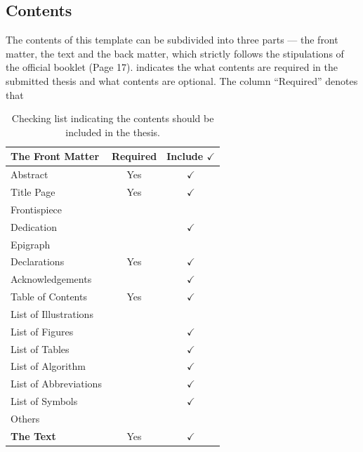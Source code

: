 \subsection{Contents}
The contents of this template can be subdivided into three parts --- the front matter, the text and the back matter, which strictly follows the stipulations of the official booklet (Page 17).  indicates the what contents are required in the submitted thesis and what contents are optional. The column ``Required'' denotes that 
\begin{center}
\begin{longtable}{|l|c|c|}
\caption{Checking list indicating the contents should be included in the thesis.}\label{chap1:longtable:checking_list}\\
\hline
\textbf{The Front Matter} & Required     &  Include $\checkmark$ \\ \hline \hline
Abstract                  & Yes          & $\checkmark$         \\
Title Page                & Yes          & $\checkmark$         \\
Frontispiece              &              &                      \\
Dedication                &              & $\checkmark$         \\
Epigraph                  &              &                      \\
Declarations              & Yes          & $\checkmark$         \\
Acknowledgements          &              & $\checkmark$         \\
Table of Contents         & Yes          & $\checkmark$         \\
List of Illustrations     &              &                      \\
List of Figures           &              & $\checkmark$         \\
List of Tables            &              & $\checkmark$         \\
List of Algorithm         &              & $\checkmark$         \\
List of Abbreviations     &              & $\checkmark$         \\
List of Symbols           &              & $\checkmark$         \\
Others                    &              &                      \\ \hline \hline
\textbf{The Text}         & Yes          & $\checkmark$         \\ \hline \hline

\end{longtable}
\end{center}
